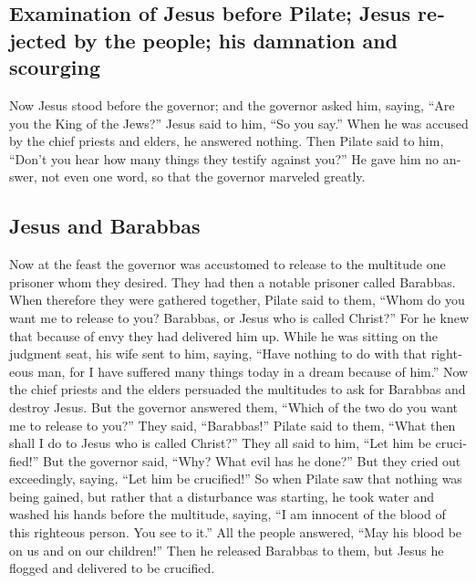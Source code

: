 \begin{paracol}{2}
\begin{otherlanguage}{english}
\hypertarget{examination-of-jesus-before-pilate-jesus-rejected-by-the-people-his-damnation-and-scourging}{%
\subsection{Examination of Jesus before Pilate; Jesus rejected by the
people; his damnation and
scourging}\label{examination-of-jesus-before-pilate-jesus-rejected-by-the-people-his-damnation-and-scourging}}

 Now Jesus stood before the governor; and the governor
asked him, saying, ``Are you the King of the Jews?'' Jesus said to him,
``So you say.''  When he was accused by the chief priests
and elders, he answered nothing.  Then Pilate said to
him, ``Don't you hear how many things they testify against you?''
 He gave him no answer, not even one word, so that the
governor marveled greatly.

\hypertarget{jesus-and-barabbas}{%
\subsection{Jesus and Barabbas}\label{jesus-and-barabbas}}

 Now at the feast the governor was accustomed to release
to the multitude one prisoner whom they desired.  They
had then a notable prisoner called Barabbas.  When
therefore they were gathered together, Pilate said to them, ``Whom do
you want me to release to you? Barabbas, or Jesus who is called
Christ?''  For he knew that because of envy they had
delivered him up.  While he was sitting on the judgment
seat, his wife sent to him, saying, ``Have nothing to do with that
righteous man, for I have suffered many things today in a dream because
of him.''  Now the chief priests and the elders persuaded
the multitudes to ask for Barabbas and destroy Jesus. 
But the governor answered them, ``Which of the two do you want me to
release to you?'' They said, ``Barabbas!''  Pilate said
to them, ``What then shall I do to Jesus who is called Christ?'' They
all said to him, ``Let him be crucified!''  But the
governor said, ``Why? What evil has he done?'' But they cried out
exceedingly, saying, ``Let him be crucified!''  So when
Pilate saw that nothing was being gained, but rather that a disturbance
was starting, he took water and washed his hands before the multitude,
saying, ``I am innocent of the blood of this righteous person. You see
to it.''  All the people answered, ``May his blood be on
us and on our children!''  Then he released Barabbas to
them, but Jesus he flogged and delivered to be crucified.


\end{otherlanguage}
\end{paracol}
